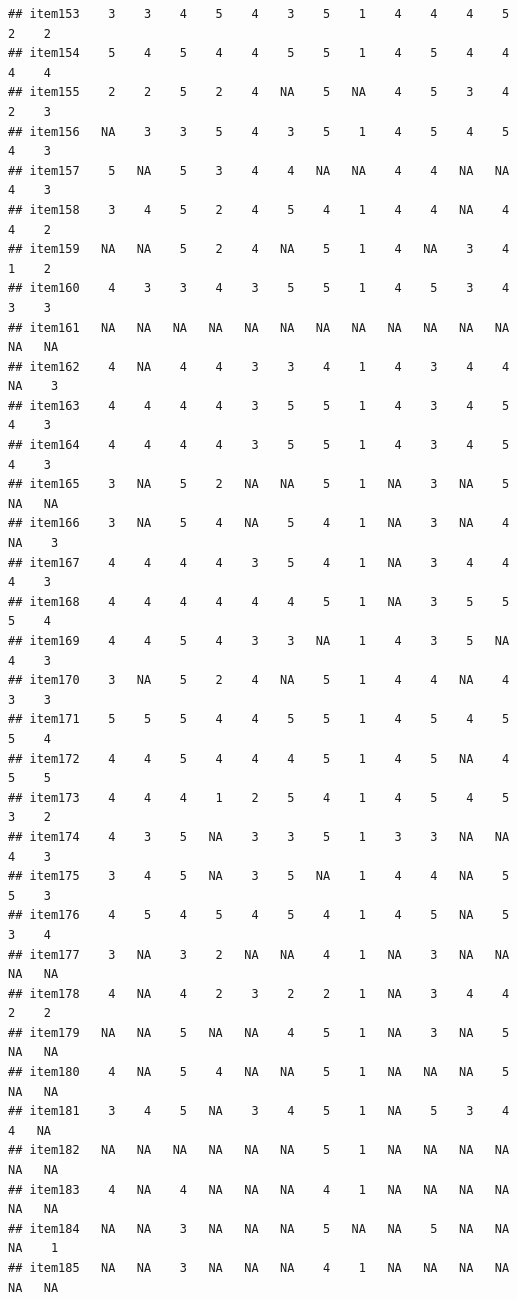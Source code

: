 \documentclass[
  man]{apa6}
\begin{document}
\begin{verbatim}
## item153    3    3    4    5    4    3    5    1    4    4    4    5    2    2
## item154    5    4    5    4    4    5    5    1    4    5    4    4    4    4
## item155    2    2    5    2    4   NA    5   NA    4    5    3    4    2    3
## item156   NA    3    3    5    4    3    5    1    4    5    4    5    4    3
## item157    5   NA    5    3    4    4   NA   NA    4    4   NA   NA    4    3
## item158    3    4    5    2    4    5    4    1    4    4   NA    4    4    2
## item159   NA   NA    5    2    4   NA    5    1    4   NA    3    4    1    2
## item160    4    3    3    4    3    5    5    1    4    5    3    4    3    3
## item161   NA   NA   NA   NA   NA   NA   NA   NA   NA   NA   NA   NA   NA   NA
## item162    4   NA    4    4    3    3    4    1    4    3    4    4   NA    3
## item163    4    4    4    4    3    5    5    1    4    3    4    5    4    3
## item164    4    4    4    4    3    5    5    1    4    3    4    5    4    3
## item165    3   NA    5    2   NA   NA    5    1   NA    3   NA    5   NA   NA
## item166    3   NA    5    4   NA    5    4    1   NA    3   NA    4   NA    3
## item167    4    4    4    4    3    5    4    1   NA    3    4    4    4    3
## item168    4    4    4    4    4    4    5    1   NA    3    5    5    5    4
## item169    4    4    5    4    3    3   NA    1    4    3    5   NA    4    3
## item170    3   NA    5    2    4   NA    5    1    4    4   NA    4    3    3
## item171    5    5    5    4    4    5    5    1    4    5    4    5    5    4
## item172    4    4    5    4    4    4    5    1    4    5   NA    4    5    5
## item173    4    4    4    1    2    5    4    1    4    5    4    5    3    2
## item174    4    3    5   NA    3    3    5    1    3    3   NA   NA    4    3
## item175    3    4    5   NA    3    5   NA    1    4    4   NA    5    5    3
## item176    4    5    4    5    4    5    4    1    4    5   NA    5    3    4
## item177    3   NA    3    2   NA   NA    4    1   NA    3   NA   NA   NA   NA
## item178    4   NA    4    2    3    2    2    1   NA    3    4    4    2    2
## item179   NA   NA    5   NA   NA    4    5    1   NA    3   NA    5   NA   NA
## item180    4   NA    5    4   NA   NA    5    1   NA   NA   NA    5   NA   NA
## item181    3    4    5   NA    3    4    5    1   NA    5    3    4    4   NA
## item182   NA   NA   NA   NA   NA   NA    5    1   NA   NA   NA   NA   NA   NA
## item183    4   NA    4   NA   NA   NA    4    1   NA   NA   NA   NA   NA   NA
## item184   NA   NA    3   NA   NA   NA    5   NA   NA    5   NA   NA   NA    1
## item185   NA   NA    3   NA   NA   NA    4    1   NA   NA   NA   NA   NA   NA

\end{verbatim}
\end{document}
